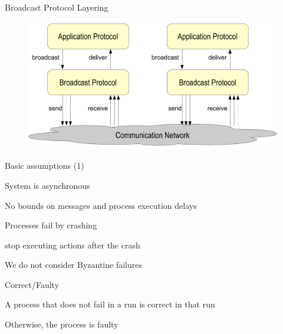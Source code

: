 \begin{frame}{Broadcast Protocol Layering}
	
\begin{figure}
\includegraphics[width=\textwidth]{layers}
\end{figure}

\end{frame}


\begin{frame}{Basic assumptions (1)}
	
\BIL

\item \alert{System is asynchronous}
	\BI
	\item No bounds on messages and process execution delays
	\EI
	
\item \alert{Processes fail by crashing}
	\BI
	\item stop executing actions after the crash
	\item We do not consider Byzantine failures
	\EI
	
\item \alert{Correct/Faulty}
	\BI
	\item A process that does not fail in a run is \alert{correct} in that run
	\item Otherwise, the process is \alert{faulty}
	\EI
	
\EIL

\end{frame}

